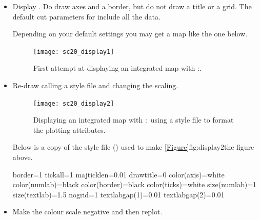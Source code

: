 \documentclass[11pt,oneside,chapters]{starlink}
\begin{document}
\begin{itemize}
\item Display . Do draw axes and a border, but do not draw a
title or a grid. The default cut parameters for 
include all the data.
\begin{terminalv}
\end{terminalv}
Depending on your default settings you may get a map like the one below.

\begin{figure}[h!]
\begin{center}
\texttt{[image: sc20\_display1]}
\caption[First attempt at displaying an integrated map with \Kappa:\display.]{\label{fig:display1}
  First attempt at displaying an integrated map with \Kappa:\display.}
\end{center}
\end{figure}

\item Re-draw calling a style file and changing the scaling.
\begin{terminalv}
\end{terminalv}

\begin{figure}[h!]
\begin{center}
\texttt{[image: sc20\_display2]}
\caption[Displaying an integrated map with \Kappa:\display\ using a style file.]{\label{fig:display2}
  Displaying an integrated map with \Kappa:\display\ using a style file
  to format the plotting attributes.}
\end{center}
\end{figure}

Below is a copy of the style file () used to make
\cref{Figure}{fig:display2}{the figure above}.

\begin{terminalv}
border=1
tickall=1
majticklen=0.01
drawtitle=0
color(axis)=white
color(numlab)=black
color(border)=black
color(ticks)=white
size(numlab)=1
size(textlab)=1.5
nogrid=1
textlabgap(1)=0.01
textlabgap(2)=0.01
\end{terminalv}

\item Make the colour scale negative and then replot.
\begin{terminalv}
\end{terminalv}


\end{itemize}
\end{document}
